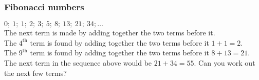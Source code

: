 \subsubsection*{Fibonacci numbers}
$0;~1;~1;~2;~3;~5;~8;~13;~21;~34;\ldots$\\
The next term is made by adding together the two terms before it.\\
The $4^{\mathrm{th}}$ term is found by adding together the two terms before it $1+1=2$.\\
The $9^{\mathrm{th}}$ term is found by adding together the two terms before it $8+13=21$.\\
The next term in the sequence above would be $21+34=55$.
Can you work out the next few terms?


